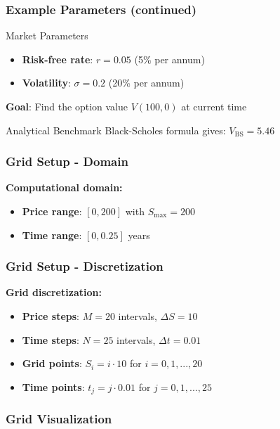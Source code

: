 \documentclass[aspectratio=169]{beamer}
\begin{document}
\begin{frame}
\frametitle{Example Parameters (continued)}
\begin{block}{Market Parameters}
\begin{itemize}
\item \textbf{Risk-free rate}: \(r = 0.05\) (5\% per annum)
\item \textbf{Volatility}: \(\sigma = 0.2\) (20\% per annum)
\end{itemize}
\end{block}

\textbf{Goal}: Find the option value \(V(100, 0)\) at current time

\begin{block}{Analytical Benchmark}
Black-Scholes formula gives: \(V_{\text{BS}} = 5.46\)
\end{block}
\end{frame}

\begin{frame}
\frametitle{Grid Setup - Domain}
\textbf{Computational domain:}

\begin{itemize}
\item \textbf{Price range}: \([0, 200]\) with \(S_{\max} = 200\)
\item \textbf{Time range}: \([0, 0.25]\) years
\end{itemize}
\end{frame}

\begin{frame}
\frametitle{Grid Setup - Discretization}
\textbf{Grid discretization:}

\begin{itemize}
\item \textbf{Price steps}: \(M = 20\) intervals, \(\Delta S = 10\)
\item \textbf{Time steps}: \(N = 25\) intervals, \(\Delta t = 0.01\)
\item \textbf{Grid points}: \(S_i = i \cdot 10\) for \(i = 0, 1, ..., 20\)
\item \textbf{Time points}: \(t_j = j \cdot 0.01\) for \(j = 0, 1, ..., 25\)
\end{itemize}
\end{frame}

\begin{frame}
\frametitle{Grid Visualization}
\begin{center}
\end{center}
\end{frame}
\end{document}
